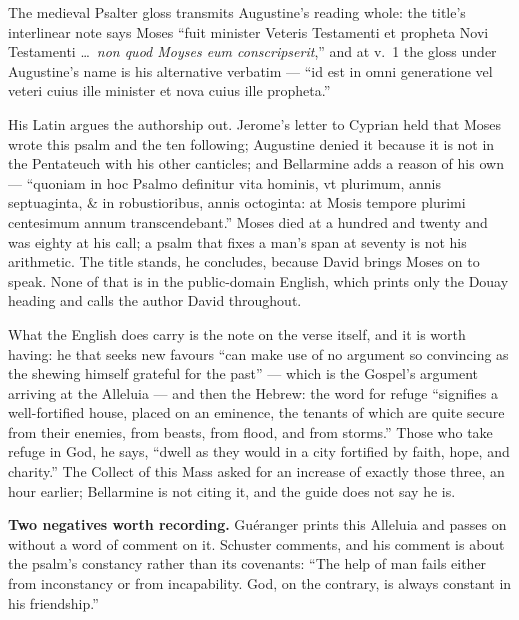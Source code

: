 The medieval Psalter gloss transmits Augustine's reading whole: the title's
interlinear note says Moses ``fuit minister Veteris Testamenti et propheta Novi
Testamenti \dots\ \emph{non quod Moyses eum conscripserit},'' and at v.~1 the
gloss under Augustine's name is his alternative verbatim --- ``id est in omni
generatione vel veteri cuius ille minister et nova cuius ille propheta.''

\begin{witnessnote}
His Latin argues the authorship out. Jerome's letter to Cyprian held that Moses
wrote this psalm and the ten following; Augustine denied it because it is not
in the Pentateuch with his other canticles; and Bellarmine adds a reason of his
own --- ``quoniam in hoc Psalmo definitur vita hominis, vt plurimum, annis
septuaginta, \& in robustioribus, annis octoginta: at Mosis tempore plurimi
centesimum annum transcendebant.'' Moses died at a hundred and twenty and was
eighty at his call; a psalm that fixes a man's span at seventy is not his
arithmetic. The title stands, he concludes, because David brings Moses on to
speak. None of that is in the public-domain English, which prints only the
Douay heading and calls the author David throughout.

What the English does carry is the note on the verse itself, and it is worth
having: he that seeks new favours ``can make use of no argument so convincing
as the shewing himself grateful for the past'' --- which is the Gospel's
argument arriving at the Alleluia --- and then the Hebrew: the word for refuge
``signifies a well-fortified house, placed on an eminence, the tenants of which
are quite secure from their enemies, from beasts, from flood, and from
storms.'' Those who take refuge in God, he says, ``dwell as they would in a
city fortified by faith, hope, and charity.'' The Collect of this Mass asked
for an increase of exactly those three, an hour earlier; Bellarmine is not
citing it, and the guide does not say he is.
\end{witnessnote}

\textbf{Two negatives worth recording.} Guéranger prints this Alleluia and
passes on without a word of comment on it. Schuster comments, and his comment
is about the psalm's constancy rather than its covenants: ``The help of man
fails either from inconstancy or from incapability. God, on the contrary, is
always constant in his friendship.''

